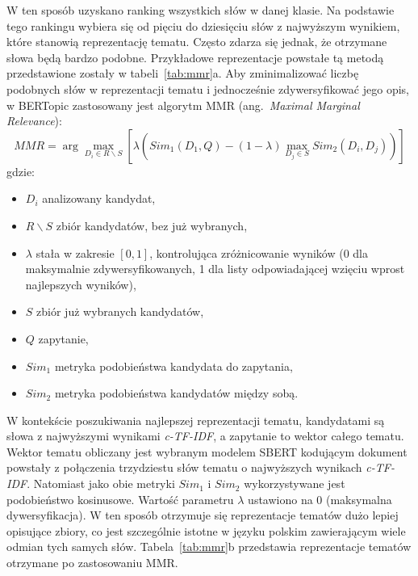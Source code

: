 	W ten sposób uzyskano ranking wszystkich słów w danej klasie.
	Na podstawie tego rankingu wybiera się od pięciu do dziesięciu słów z najwyższym wynikiem, które stanowią reprezentację tematu.
	Często zdarza się jednak, że otrzymane słowa będą bardzo podobne.
	Przykładowe reprezentacje powstałe tą metodą przedstawione zostały w tabeli~\ref{tab:mmr}a.
	Aby zminimalizować liczbę podobnych słów w reprezentacji tematu i jednocześnie zdywersyfikować jego opis,
		w BERTopic zastosowany jest algorytm MMR (ang.\ \emph{Maximal Marginal Relevance})\cite{MMR}:
	\[MMR = \arg \max_{D_i \in R\backslash S} \left[\lambda\left(Sim_1(D_1, Q) - (1-\lambda) \max_{D_j \in S} Sim_2(D_i, D_j)\right)\right]\]
	gdzie:
	\begin{itemize}
		\item \(D_i\) analizowany kandydat,
		\item \(R\backslash S\) zbiór kandydatów, bez już wybranych,
		\item \(\lambda\) stała w zakresie \(\left[0,1\right]\), kontrolująca zróżnicowanie wyników (0 dla maksymalnie zdywersyfikowanych, 1 dla listy odpowiadającej wzięciu wprost najlepszych wyników),
		\item \(S\) zbiór już wybranych kandydatów,
		\item \(Q\) zapytanie,
		\item \(Sim_1\) metryka podobieństwa kandydata do zapytania,
		\item \(Sim_2\) metryka podobieństwa kandydatów między sobą.
	\end{itemize}
	W kontekście poszukiwania najlepszej reprezentacji tematu, kandydatami są słowa z najwyższymi wynikami \emph{c-TF-IDF}, a zapytanie to wektor całego tematu.
	Wektor tematu obliczany jest wybranym modelem SBERT kodującym dokument powstały z połączenia trzydziestu słów tematu o najwyższych wynikach \emph{c-TF-IDF}.
	Natomiast jako obie metryki \(Sim_1\) i \(Sim_2\) wykorzystywane jest podobieństwo kosinusowe.
	Wartość parametru \(\lambda\) ustawiono na 0 (maksymalna dywersyfikacja).
	W ten sposób otrzymuje się reprezentacje tematów dużo lepiej opisujące zbiory,
		co jest szczególnie istotne w języku polskim zawierającym wiele odmian tych samych słów.
	Tabela~\ref{tab:mmr}b przedstawia reprezentacje tematów otrzymane po zastosowaniu MMR\@.

